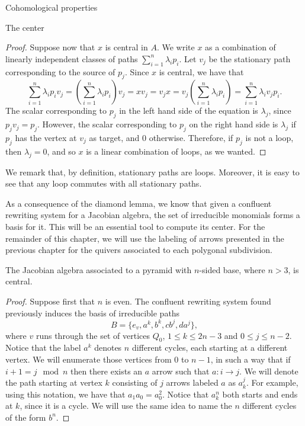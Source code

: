 \begin{chapter}{Cohomological properties}
\begin{section}{The center}
\begin{proof}
Suppose now that $x$ is central in $A$. We write $x$ as a combination of linearly independent classes of paths $\sum_{i=1}^n \lambda_i p_i$. Let $v_j$ be the stationary path corresponding to the source of $p_j$. Since $x$ is central, we have that
\[\sum_{i=1}^n \lambda_i p_iv_j=(\sum_{i=1}^n \lambda_i p_i)v_j = xv_j=v_jx = v_j(\sum_{i=1}^n \lambda_i p_i)=\sum_{i=1}^n \lambda_i v_jp_i.\]
The scalar corresponding to $p_j$ in the left hand side of the equation is $\lambda_j$, since $p_jv_j=p_j$. However, the scalar corresponding to $p_j$ on the right hand side is $\lambda_j$ if $p_j$ has the vertex at $v_j$ as target, and 0 otherwise. Therefore, if $p_j$ is not a loop, then $\lambda_j=0$, and so $x$ is a linear combination of loops, as we wanted.
\end{proof}

We remark that, by definition, stationary paths are loops. Moreover, it is easy to see that any loop commutes with all stationary paths.

As a consequence of the diamond lemma, we know that given a confluent rewriting system for a Jacobian algebra, the set of irreducible monomials forms a basis for it. This will be an essential tool to compute its center. For the remainder of this chapter, we will use the labeling of arrows presented in the previous chapter for the quivers associated to each polygonal subdivision.

\begin{prop} The Jacobian algebra associated to a pyramid with $n$-sided base, where $n>3$, is central.
\end{prop}
\begin{proof} Suppose first that $n$ is even. The confluent rewriting system found previously induces the basis of irreducible paths 
\[B=\{e_v,a^k,b^k,cb^j, da^j\},\] 
where $v$ runs through the set of vertices $Q_0$, $1\leq k\leq 2n-3$ and $0\leq j\leq n-2$. Notice that the label $a^k$ denotes $n$ different cycles, each starting at a different vertex. We will enumerate those vertices from $0$ to $n-1$, in such a way that if $i+1=j \mod n$ then there exists an $a$ arrow such that $a:i\to j$. We will denote the path starting at vertex $k$ consisting of $j$ arrows labeled $a$ as $a_k^j$. For example, using this notation, we have that $a_1a_0=a_0^2$. Notice that $a_k^n$ both starts and ends at $k$, since it is a cycle. We will use the same idea to name the $n$ different cycles of the form $b^n$.


\end{proof}
\end{section}
\end{chapter}
